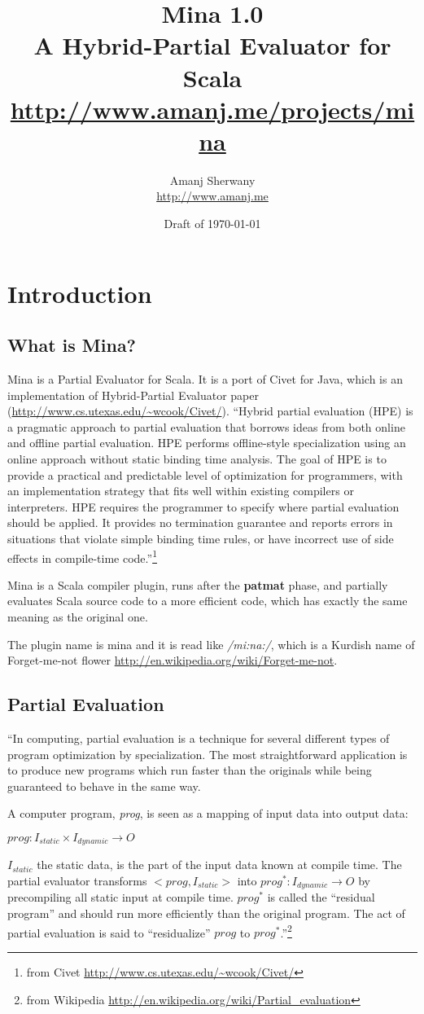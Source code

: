 \documentclass[10pt, a4paper]{article}
\title{\textbf{\huge{Mina 1.0}}\\ \large{A Hybrid-Partial Evaluator for Scala}\\
  \small{\url{http://www.amanj.me/projects/mina}}}
\author{Amanj Sherwany \\ \small{\url{http://www.amanj.me}}}
\date{Draft of \today}
\begin{document}
\maketitle
{}

\tableofcontents
\newpage
\lstset{language=scala}
\section{Introduction}
\subsection{What is Mina?}
Mina is a Partial Evaluator for Scala. It is a port of Civet for Java, which is
an implementation of Hybrid-Partial Evaluator paper
(\url{http://www.cs.utexas.edu/~wcook/Civet/}). ``Hybrid partial evaluation
(HPE) is a pragmatic approach to partial evaluation that borrows ideas from
both online and offline partial evaluation. HPE performs offline-style
specialization using an online approach without static binding time analysis.
The goal of HPE is to provide a practical and predictable level of optimization
for programmers, with an implementation strategy that fits well within existing
compilers or interpreters. HPE requires the programmer to specify where partial
evaluation should be applied. It provides no termination guarantee and reports
errors in situations that violate simple binding time rules, or have incorrect
use of side effects in compile-time code.''\footnote{from Civet
\url{http://www.cs.utexas.edu/~wcook/Civet/}}

Mina is a Scala compiler plugin, runs after the \textbf{patmat} phase, and
partially evaluates Scala source code to a more efficient code, which has
exactly the same meaning as the original one.

The plugin name is mina and it is read like \emph{/mi:na:/}, which is a Kurdish
name of Forget-me-not flower \url{http://en.wikipedia.org/wiki/Forget-me-not}.


\subsection{Partial Evaluation}
``In computing, partial evaluation is a technique for several different types
of program optimization by specialization. The most straightforward application
is to produce new programs which run faster than the originals while being
guaranteed to behave in the same way.

A computer program, \emph{prog}, is seen as a mapping of input data into output
data:
\centerline{$prog: I_{static} \times I_{dynamic} \to O$}
$I_{static}$ the static data, is the part of the input data known at compile
time. The partial evaluator transforms $<prog, I_{static}>$ into $prog^{*}:
I_{dynamic} \to O$ by precompiling all static input at compile time. $prog^{*}$
is called the ``residual program'' and should run more efficiently than the
original program. The act of partial evaluation is said to ``residualize''
$prog$ to $prog^*$.''\footnote{from Wikipedia
\url{http://en.wikipedia.org/wiki/Partial_evaluation}}
\end{document}
